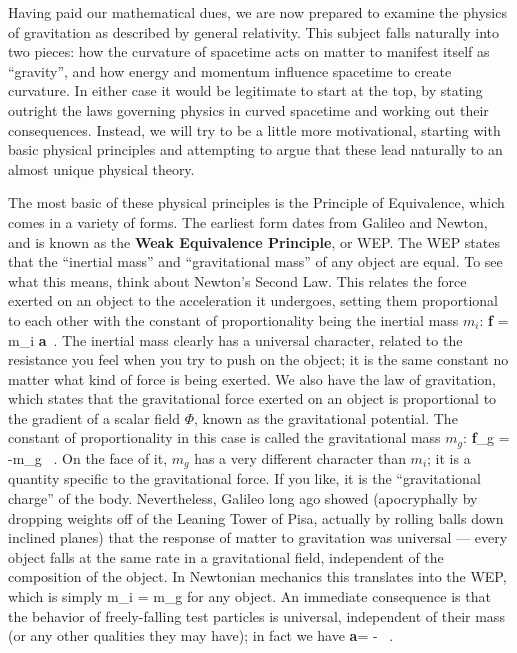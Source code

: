 Having paid our mathematical dues, we are now prepared to examine
the physics of gravitation as described by general relativity.  This
subject falls naturally into two pieces:  how the curvature of
spacetime acts on matter to manifest itself as ``gravity'', and 
how energy and momentum influence spacetime to create curvature.
In either case it would be legitimate to start at the top, by stating
outright the laws governing physics in curved spacetime and working
out their consequences.  Instead, we will try to be a little more
motivational, starting with basic physical principles and attempting
to argue that these lead naturally to an almost unique physical 
theory.

The most basic of these physical principles is the Principle of
Equivalence, which comes in a variety of forms.  The earliest form
dates from Galileo and Newton, and is known as the {\bf Weak
Equivalence Principle}, or WEP.  The WEP states that the ``inertial
mass'' and ``gravitational mass'' of any object are equal.  To see
what this means, think about Newton's Second Law.  This relates
the force exerted on an object to the acceleration it undergoes,
setting them proportional to each other with the constant of 
proportionality being the inertial mass $m_i$:
\be
  {\bf f} = m_i {\bf a}\ .\label{4.1}
\ee
The inertial mass clearly has a universal character, related to the
resistance you feel when you try to push on the object; it is the
same constant no matter what kind of force is being exerted.  We also
have the law of gravitation, which states that the gravitational
force exerted on an object is proportional to the gradient of a scalar
field $\Phi$, known as the gravitational potential.  The constant of
proportionality in this case is called the gravitational mass $m_g$:
\be
  {\bf f}_g = -m_g \nabla\Phi\ .\label{4.2}
\ee
On the face of it, $m_g$ has a very different character than $m_i$;
it is a quantity specific to the gravitational force.  If you like, it
is the ``gravitational charge'' of the body.  Nevertheless, Galileo
long ago showed (apocryphally by dropping weights off of the Leaning
Tower of Pisa, actually by rolling balls down inclined planes) that
the response of matter to gravitation was universal --- every object
falls at the same rate in a gravitational field, independent of
the composition of the object.  In Newtonian mechanics this 
translates into the WEP, which is simply
\be
  m_i = m_g\label{4.3}
\ee
for any object.  An immediate consequence is that the behavior of
freely-falling test particles is universal, independent of their mass
(or any other qualities they may have); in fact we have
\be
  {\bf a}= - \nabla\Phi\ .\label{4.4}
\ee

